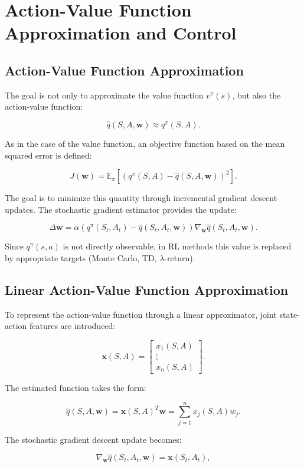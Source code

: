 \section{Action-Value Function Approximation and Control}
\subsection{Action-Value Function Approximation}

The goal is not only to approximate the value function $v^\pi(s)$, but also the action-value function:

\[
\hat{q}(S,A,\mathbf{w}) \approx q^\pi(S,A).
\]

As in the case of the value function, an objective function based on the mean squared error is defined:

\[
J(\mathbf{w})
=
\mathbb{E}_\pi \left[
\left( q^\pi(S,A) - \hat{q}(S,A,\mathbf{w}) \right)^2
\right].
\]

The goal is to minimize this quantity through incremental gradient descent updates.
The stochastic gradient estimator provides the update:

\[
\Delta \mathbf{w}
=
\alpha \left( q^\pi(S_t,A_t) - \hat{q}(S_t,A_t,\mathbf{w}) \right)
\nabla_{\mathbf{w}} \hat{q}(S_t,A_t,\mathbf{w}).
\]

Since $q^\pi(s,a)$ is not directly observable, in RL methods this value is replaced by appropriate targets (Monte Carlo, TD, $\lambda$-return).

\subsection{Linear Action-Value Function Approximation}

To represent the action-value function through a linear approximator, joint state-action features are introduced:

\[
\mathbf{x}(S,A)
=
\begin{bmatrix}
x_1(S,A) \\
\vdots \\
x_n(S,A)
\end{bmatrix}.
\]

The estimated function takes the form:

\[
\hat{q}(S,A,\mathbf{w})
=
\mathbf{x}(S,A)^T \mathbf{w}
=
\sum_{j=1}^{n} x_j(S,A) w_j.
\]

The stochastic gradient descent update becomes:

\[
\nabla_{\mathbf{w}} \hat{q}(S_t,A_t,\mathbf{w}) = \mathbf{x}(S_t,A_t),
\]

